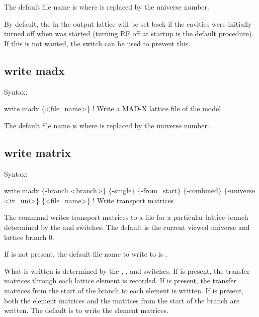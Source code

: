 {{{{{{{{{{{The default file name is  where \vn{\#} is replaced by the universe number. 

By default, the  in the output lattice will be set back  if the cavities were
initially turned off when \tao was started (turning RF off at startup is the default procedure). If
this is not wanted, the  switch can be used to prevent this.


\subsection{write madx}
\label{s:write.madx}

Syntax:
\begin{example}
    write madx \{<file_name>\}  ! Write a MAD-X lattice file of the model
\end{example}

The default file name is  where \vn{\#} is replaced by the universe number. 


\subsection{write matrix}
\label{s:write.mat}

Syntax:
\begin{example}
    write madx \{-branch <branch>\} \{-single\} \{-from_start\} \{-combined\}
               \{-universe <ix_uni>\} \{<file_name>\}  ! Write transport matrices
\end{example}

The  command writes transport matrices to a file for a particular lattice branch
determined by the  and  switches. The default is the current viewed
universe and lattice branch 0.

If  is not present, the default file name to write to is .

What is written is determined by the , , and 
switches. If  is present, the transfer matrices through each lattice element is recorded.
If  is present, the transfer matrices from the start of the branch to each element
is written. If  is present, both the element matrices and the matrices from the start
of the branch are written. The default is to write the element matrices.

}}}}}}}}}}}
